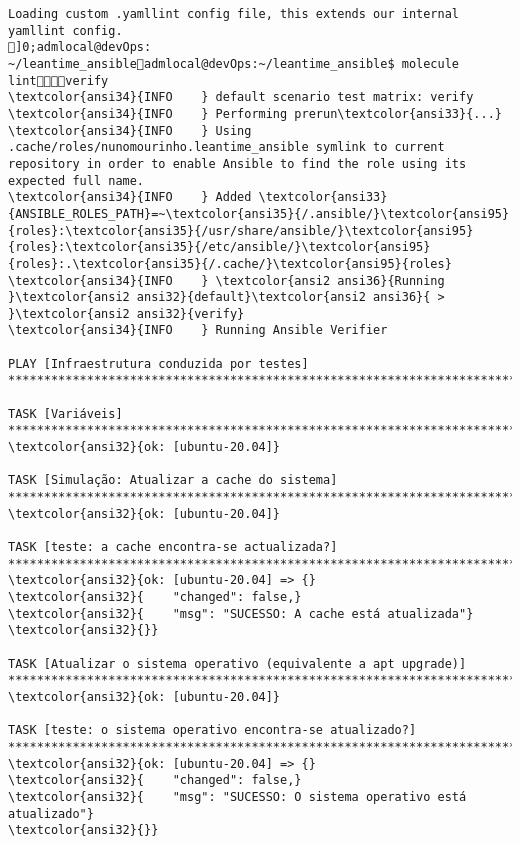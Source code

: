 \documentclass{scrartcl}
\begin{document}
\begin{Verbatim}
Loading custom .yamllint config file, this extends our internal yamllint config.
]0;admlocal@devOps: ~/leantime_ansibleadmlocal@devOps:~/leantime_ansible$ molecule lintverify
\textcolor{ansi34}{INFO    } default scenario test matrix: verify
\textcolor{ansi34}{INFO    } Performing prerun\textcolor{ansi33}{...}
\textcolor{ansi34}{INFO    } Using .cache/roles/nunomourinho.leantime_ansible symlink to current repository in order to enable Ansible to find the role using its expected full name.
\textcolor{ansi34}{INFO    } Added \textcolor{ansi33}{ANSIBLE_ROLES_PATH}=~\textcolor{ansi35}{/.ansible/}\textcolor{ansi95}{roles}:\textcolor{ansi35}{/usr/share/ansible/}\textcolor{ansi95}{roles}:\textcolor{ansi35}{/etc/ansible/}\textcolor{ansi95}{roles}:.\textcolor{ansi35}{/.cache/}\textcolor{ansi95}{roles}
\textcolor{ansi34}{INFO    } \textcolor{ansi2 ansi36}{Running }\textcolor{ansi2 ansi32}{default}\textcolor{ansi2 ansi36}{ > }\textcolor{ansi2 ansi32}{verify}
\textcolor{ansi34}{INFO    } Running Ansible Verifier

PLAY [Infraestrutura conduzida por testes] ***********************************************************************************************

TASK [Variáveis] *************************************************************************************************************************
\textcolor{ansi32}{ok: [ubuntu-20.04]}

TASK [Simulação: Atualizar a cache do sistema] *******************************************************************************************
\textcolor{ansi32}{ok: [ubuntu-20.04]}

TASK [teste: a cache encontra-se actualizada?] *******************************************************************************************
\textcolor{ansi32}{ok: [ubuntu-20.04] => {}
\textcolor{ansi32}{    "changed": false,}
\textcolor{ansi32}{    "msg": "SUCESSO: A cache está atualizada"}
\textcolor{ansi32}{}}

TASK [Atualizar o sistema operativo (equivalente a apt upgrade)] *************************************************************************
\textcolor{ansi32}{ok: [ubuntu-20.04]}

TASK [teste: o sistema operativo encontra-se atualizado?] ********************************************************************************
\textcolor{ansi32}{ok: [ubuntu-20.04] => {}
\textcolor{ansi32}{    "changed": false,}
\textcolor{ansi32}{    "msg": "SUCESSO: O sistema operativo está atualizado"}
\textcolor{ansi32}{}}


\end{Verbatim}
\end{document}
